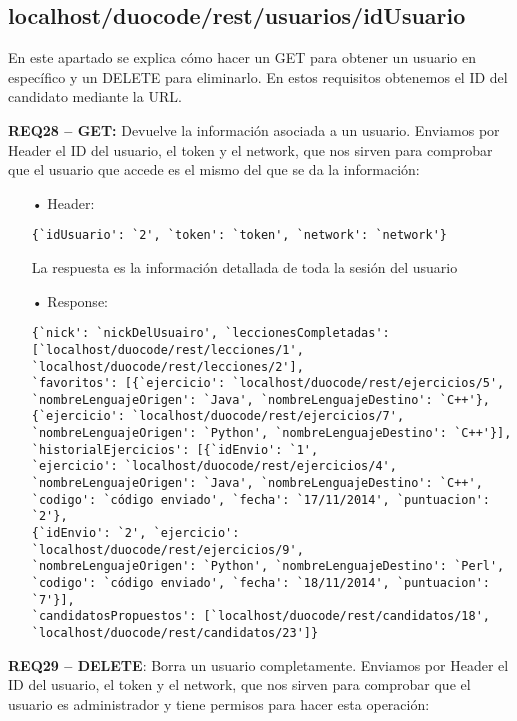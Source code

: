 \subsection{localhost/duocode/rest/usuarios/idUsuario}
En este apartado se explica cómo hacer un GET para obtener un usuario en específico y un DELETE para eliminarlo.
En estos requisitos obtenemos el ID del candidato mediante la URL.
\vspace{1em}

\textbf{REQ28 – GET:} Devuelve la información asociada a un usuario. Enviamos por Header el ID del usuario, el token y el network, que nos sirven para comprobar que el usuario que accede es el mismo del que se da la información:

\begin{itemize}
\item[•]
Header: 
{\codesize
\begin{verbatim}
{`idUsuario': `2', `token': `token', `network': `network'}
\end{verbatim}
}

La respuesta es la información detallada de toda la sesión del usuario
\item[•]
Response: 
{\codesize
\begin{verbatim}
{`nick': `nickDelUsuairo', `leccionesCompletadas': 
[`localhost/duocode/rest/lecciones/1', `localhost/duocode/rest/lecciones/2'], 
`favoritos': [{`ejercicio': `localhost/duocode/rest/ejercicios/5', 
`nombreLenguajeOrigen': `Java', `nombreLenguajeDestino': `C++'}, 
{`ejercicio': `localhost/duocode/rest/ejercicios/7', 
`nombreLenguajeOrigen': `Python', `nombreLenguajeDestino': `C++'}], 
`historialEjercicios': [{`idEnvio': `1', 
`ejercicio': `localhost/duocode/rest/ejercicios/4', 
`nombreLenguajeOrigen': `Java', `nombreLenguajeDestino': `C++', 
`codigo': `código enviado', `fecha': `17/11/2014', `puntuacion': `2'}, 
{`idEnvio': `2', `ejercicio': `localhost/duocode/rest/ejercicios/9', 
`nombreLenguajeOrigen': `Python', `nombreLenguajeDestino': `Perl', 
`codigo': `código enviado', `fecha': `18/11/2014', `puntuacion': `7'}], 
`candidatosPropuestos': [`localhost/duocode/rest/candidatos/18', 
`localhost/duocode/rest/candidatos/23']}
\end{verbatim}
}
\end{itemize}

\textbf{REQ29 – DELETE}: Borra un usuario completamente.
Enviamos por Header el ID del usuario, el token y el network, que nos sirven para comprobar que el usuario es administrador y tiene permisos para hacer esta operación:

